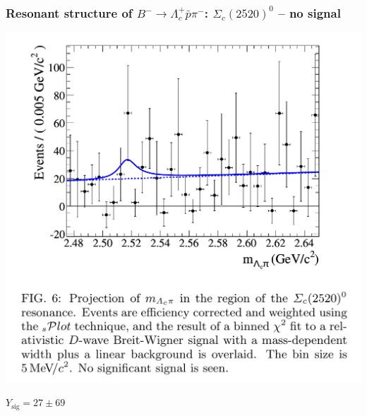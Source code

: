 \documentclass[10pt, aspectratio=169]{beamer}
\begin{document}
\begin{frame}[label=resonances-sc2520]%
  \frametitle{Resonant structure of $B^- \to \Lambda_c^+\bar{p}\pi^-$: $\Sigma_c(2520)^0$ -- no signal}
  \centering

  \hspace*{.15\textwidth}
  \parbox{.5\textwidth}{
    \includegraphics[width=\linewidth]{figures/002/fit-Sc2520}
  } \parbox{.2\textwidth}{
    \centering \small
    $Y_\mathrm{sig} = 27 \pm 69$
  }
\end{frame}%
\end{document}
